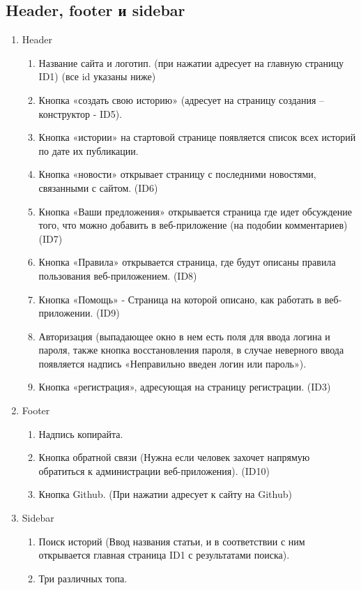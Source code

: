 \documentclass[a4paper]{article}
\begin{document}
		\subsection{Header, footer и sidebar}
		\begin{enumerate}
			\item Header
				\begin{enumerate}
					\item Название сайта и логотип. (при нажатии адресует на главную страницу ID1) (все id указаны ниже)
					\item Кнопка «создать свою историю» (адресует на страницу создания – конструктор - ID5).
					\item Кнопка «истории» на стартовой странице появляется список всех историй по дате их публикации.
					\item Кнопка «новости» открывает страницу с последними новостями, связанными с сайтом. (ID6)
					\item Кнопка «Ваши предложения» открывается страница где идет обсуждение того, что можно добавить в веб-приложение (на подобии комментариев) (ID7)
					\item Кнопка «Правила» открывается страница, где будут описаны правила пользования веб-приложением. (ID8)
					\item Кнопка «Помощь» -  Страница на которой описано, как работать в веб-приложении. (ID9)
					\item Авторизация (выпадающее окно в нем есть поля для ввода логина и пароля, также кнопка восстановления пароля, в случае неверного ввода появляется надпись «Неправильно введен логин или пароль»).
					\item Кнопка «регистрация», адресующая на страницу регистрации. (ID3)
				\end{enumerate}
			\item Footer
				\begin{enumerate}
					\item Надпись копирайта.
					\item Кнопка обратной связи (Нужна если человек захочет напрямую обратиться к администрации веб-приложения). (ID10)
					\item Кнопка Github. (При нажатии адресует к сайту на Github)
				\end{enumerate}
			\item Sidebar
				\begin{enumerate}
					\item Поиск историй (Ввод названия статьи, и в соответствии с ним открывается главная страница ID1 с результатами поиска).
					\item Три различных топа.
				\end{enumerate}
		\end{enumerate}
		\newpage
\end{document}
